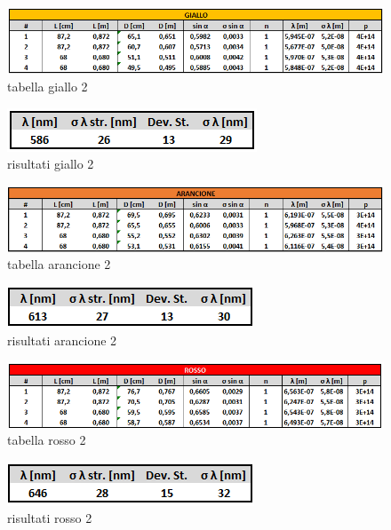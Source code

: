 \documentclass{article}
\begin{document}
\begin{figure}[h!]
  \centering
  \includegraphics[width=1\linewidth]{IM tabella giallo 2}
  \caption{tabella giallo 2}
\end{figure}

\begin{figure}[h!]
  \centering
  \includegraphics[width=0.4\linewidth]{IM risultati giallo 2}
  \caption{risultati giallo 2}
\end{figure}

\begin{figure}[h!]
  \centering
  \includegraphics[width=1\linewidth]{IM tabella arancio 2}
  \caption{tabella arancione 2}
\end{figure}

\begin{figure}[h!]
  \centering
  \includegraphics[width=0.4\linewidth]{IM risultati arancio 2}
  \caption{risultati arancione 2}
\end{figure}

\begin{figure}[h!]
  \centering
  \includegraphics[width=1\linewidth]{IM tabella rosso 2}
  \caption{tabella rosso 2}
\end{figure}

\begin{figure}[h!]
  \centering
  \includegraphics[width=0.4\linewidth]{IM risultati rosso 2}
  \caption{risultati rosso 2}
\end{figure}
\end{document}
